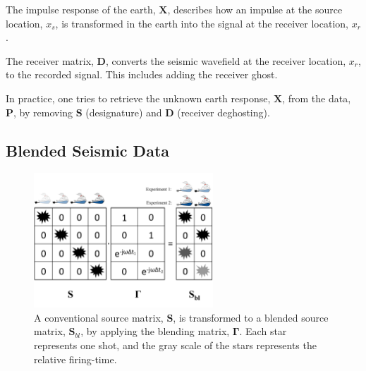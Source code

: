 The impulse response of the earth, $\mathbf{X}$, describes how an impulse at the source location, $x_s$, is transformed in the earth into the signal at the receiver location, $x_r$.

The receiver matrix, $\mathbf{D}$, converts the seismic wavefield at the receiver location, $x_r$, to the recorded signal. This includes adding the receiver ghost.

In practice, one tries to retrieve the unknown earth response, $\mathbf{X}$, from the data, $\mathbf{P}$, by removing $\mathbf{S}$ (designature) and $\mathbf{D}$ (receiver deghosting).



\subsection{Blended Seismic Data}

\begin{figure}
	
	\centering
	\includegraphics[width=0.6\textwidth]{Plots/Blended-Source-edit2}
	\caption{A conventional source matrix, $\mathbf{S}$, is transformed to a blended source matrix, $\mathbf{S}_{bl}$, by applying the blending matrix, $\mathbf{\Gamma}$. Each star represents one shot, and the gray scale of the stars represents the relative firing-time.}
	\label{fig:Ch-Theory-BlendedSource}
\end{figure}


